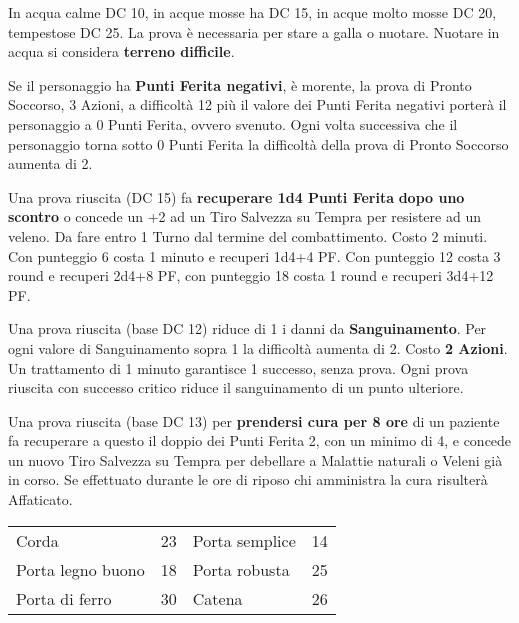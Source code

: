 \documentclass[landscape,10pt,a4paper]{article}
\begin{document}
\begin{multicols}{3}
\begin{dmbox}[title=Nuotare - pagina \pageref{compnuotare} - \pageref{combatteresottacqua}]
In acqua calme DC 10, in acque mosse ha DC 15, in acque molto mosse DC 20, tempestose DC 25. La prova è necessaria per stare a galla o nuotare. Nuotare in acqua si considera \textbf{terreno difficile}.
\end{dmbox}

\begin{dmbox}[title=Pronto Soccorso - pagina \pageref{prontosoccorso}]
Se il personaggio ha \textbf{Punti Ferita negativi}, è morente, la prova di Pronto Soccorso, 3 Azioni, a difficoltà 12 più il valore dei Punti Ferita negativi porterà il personaggio a 0 Punti Ferita, ovvero svenuto. Ogni volta successiva che il personaggio torna sotto 0 Punti Ferita la difficoltà della prova di Pronto Soccorso aumenta di 2.

Una prova riuscita (DC 15) fa \textbf{recuperare 1d4 Punti Ferita} \textbf{dopo uno scontro} o concede un +2 ad un Tiro Salvezza su Tempra per resistere ad un veleno. Da fare entro 1 Turno dal termine del combattimento.  Costo 2 minuti.
Con punteggio 6 costa 1 minuto e recuperi 1d4+4 PF. Con punteggio 12 costa 3 round e recuperi 2d4+8 PF, con punteggio 18 costa 1 round e recuperi 3d4+12 PF.

Una prova riuscita (base DC 12) riduce di 1 i danni da \textbf{Sanguinamento}. Per ogni valore di Sanguinamento sopra 1 la difficoltà aumenta di 2. Costo \textbf{2 Azioni}.
Un trattamento di 1 minuto garantisce 1 successo, senza prova. Ogni prova riuscita con successo critico riduce il sanguinamento di un punto ulteriore.

Una prova riuscita (base DC 13) per \textbf{prendersi cura per 8 ore} di un paziente fa recuperare a questo il doppio dei Punti Ferita 2, con un minimo di 4, e concede un nuovo Tiro Salvezza su Tempra per debellare a Malattie naturali o Veleni già in corso.
Se effettuato durante le ore di riposo chi amministra la cura risulterà Affaticato.
\end{dmbox}

\begin{dmbox}[title=Rompere Oggetti - DC Forzai]	
	\begin{tabular}{ll|ll}
		Corda      & 23&Porta semplice         & 14\\
		Porta legno buono  & 18&Porta robusta          & 25\\
		Porta di ferro     & 30&Catena                 & 26 \\
	\end{tabular}
\end{dmbox}



\end{multicols}
\end{document}
